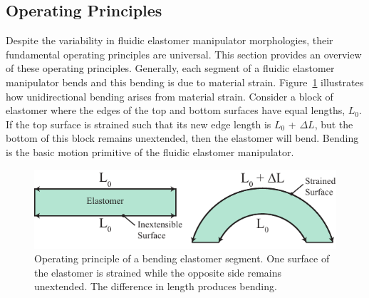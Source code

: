 \subsection{Operating Principles}
\label{subsec:Actuators, Operating Principles}
Despite the variability in fluidic elastomer manipulator morphologies, their fundamental operating principles are universal.
This section provides an overview of these operating principles.
Generally, each segment of a fluidic elastomer manipulator bends and this bending is due to material strain.
Figure~\ref{fig:ElastomerBending} illustrates how unidirectional bending arises from material strain.
Consider a block of elastomer where the edges of the top and bottom surfaces have equal lengths, $L_0$.
If the top surface is strained such that its new edge length is $L_0$ + $\Delta L$, but the bottom of this block remains unextended, then the elastomer will bend.
Bending is the basic motion primitive of the fluidic elastomer manipulator.
\begin{figure}[htb]
\centering
\includegraphics[width=0.85\columnwidth]{figures/actuators/ElastomerBending}
\caption[Operating principle of a bending elastomer segment.]{Operating principle of a bending elastomer segment. One surface of the elastomer is strained while the opposite side remains unextended. The difference in length produces bending.}
\label{fig:ElastomerBending}
\end{figure}

